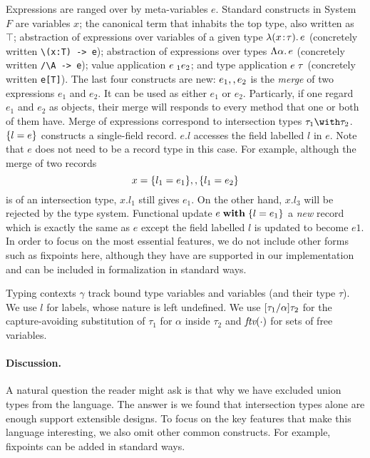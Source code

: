 Expressions are ranged over by meta-variables $e$. 
Standard constructs in System $F$ are 
variables $ x $; 
the canonical term that inhabits the top type, also written as $\top$;
abstraction of expressions over variables of a given type $ \lambda (x \!:\! \tau).\, e $ (concretely written \lstinline$\(x:T) -> e$); 
abstraction of expressions over types $ \Lambda \alpha.\, e $ (concretely written \lstinline$/\A -> e$); 
value application $ e \; _1 e_2 $;
and type application $ e \; \tau $ (concretely written \lstinline$e[T]$). 
The last four constructs are new: $ e_1 ,, e_2 $ 
is the \emph{merge} of two expressions $ e_1 $ and $ e_2 $.
It can be used as either $ e_1 $ or $ e_2 $. Particarly, if one regard $ e_1 $
and $ e_2 $ as objects, their merge will responds to every method that one or
both of them have. Merge of expressions correspond to intersection types
$ \tau_1 \andop \tau_2 $. $ \{ l = e \} $ constructs a single-field record.
$ e.l $ accesses the field labelled $ l $ in $ e $. Note that $ e $ does not
need to be a record type in this case. For example, although the merge of two
records
\[
x = \{ l_1 = e_1 \} ,, \{ l_1 = e_2 \} 
\]
is of an intersection type, $ x.{l_1} $ still gives $ e_1 $. On the other hand,
$ x.{l_3} $ will be rejected by the type system. Functional update $ e \; \mathbf{with} \; \{l = e_1\} $ a
\emph{new} record which is exactly the same as $ e $ except the field labelled
$ l $ is updated to become $ e1 $. In order to focus on the most essential
features, we do not include other forms such as fixpoints here, although they
have are supported in our implementation and can be included in formalization in
standard ways.


Typing contexts $ \gamma $ track bound type variables and variables (and their
type $\tau$). We use $l$ for labels, whose nature is left undefined. We use
$\lbrack \tau_1 / \alpha \rbrack {\tau_2}$ for the capture-avoiding substitution of
$\tau_1$ for $\alpha$ inside $\tau_2$ and $\textit{ftv}({\cdot})$ for sets of free
variables.

\paragraph{Discussion.} A natural question the reader might ask is that why we
have excluded union types from the language. The answer is we found that
intersection types alone are enough support extensible designs. To focus on the
key features that make this language interesting, we also omit other common
constructs. For example, fixpoints can be added in standard ways.

